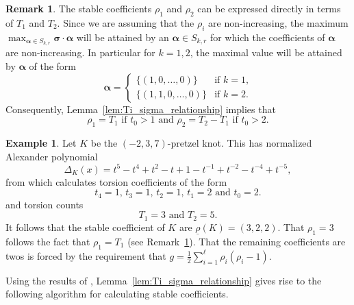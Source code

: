 \documentclass{amsart} %
\newcommand{\bsigma}{\bm{\sigma}}
\theoremstyle{thm}
\theoremstyle{definition}
\newtheorem{rem}[Theorem]{Remark}
\newtheorem{ex}[Theorem]{Example}
\numberwithin{equation}{section}
\begin{document}
\begin{rem}\label{rem:stable_hand_calc}
The stable coefficients $\rho_1$ and $\rho_2$ can be expressed directly in terms of $T_1$ and $T_2$. Since we are assuming that the $\rho_i$ are non-increasing, the maximum $\max_{\bm{\alpha}\in S_{k,r}} \bsigma \cdot\bm{\alpha}$ will be attained by an $\bm{\alpha} \in S_{k,r}$ for which the coefficients of $\bm{\alpha}$ are non-increasing. In particular for $k=1,2$, the maximal value will be attained by $\bm{\alpha}$ of the form
\[
\bm{\alpha}=\begin{cases}
    \{(1,0, \dots, 0) \} & \text{if $k=1$,}\\
\{(1,1,0, \dots, 0) \}& \text{if $k=2$.} 
\end{cases}
\]
Consequently, Lemma~\ref{lem:Ti_sigma_relationship} implies that
\[
\text{$\rho_1=T_1$ if $t_0>1$ and $\rho_2= T_2-T_1$ if $t_0>2$.}
\]
\end{rem}
\begin{ex}
    Let $K$ be the $(-2,3,7)$-pretzel knot. This has normalized Alexander polynomial
    \[
    \Delta_K(x)=t^5-t^4+t^2-t+1-t^{-1}+t^{-2}-t^{-4}+t^{-5},
    \]
    from which calculates torsion coefficients of the form
    \[
    \text{$t_4=1$, $t_3=1$, $t_2=1$, $t_1=2$ and $t_0=2$.}
    \]
    and torsion counts
    \[\text{$T_1=3$ and $T_2=5$}.\]
    It follows that the stable coefficient of $K$ are $\underline{\rho}(K)=(3,2,2)$. That $\rho_1=3$ follows the fact that $\rho_1=T_1$ (see Remark~\ref{rem:stable_hand_calc}). That the remaining coefficients are twos is forced by the requirement that $g = \frac12\sum_{i=1}^{\ell} \rho_i(\rho_i -1)$.
\end{ex}
Using the results of \cite{Mc17}, Lemma~\ref{lem:Ti_sigma_relationship} gives rise to the following algorithm for calculating stable coefficients.
\end{document}
